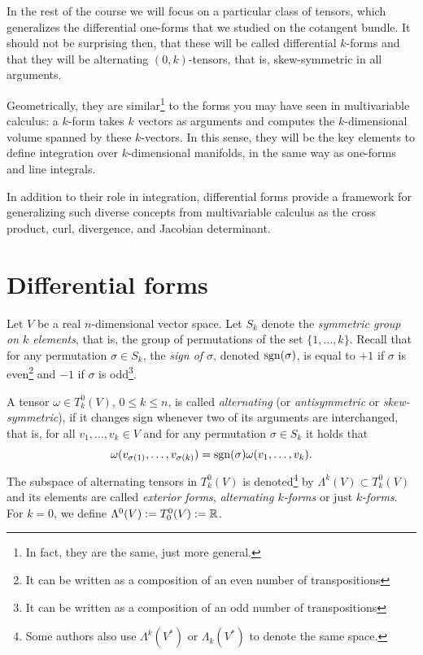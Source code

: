 In the rest of the course we will focus on a particular class of tensors, which generalizes the differential one-forms that we studied on the cotangent bundle.
It should not be surprising then, that these will be called differential $k$-forms and that they will be alternating $(0,k)$-tensors, that is, skew-symmetric in all arguments.

Geometrically, they are similar\footnote{In fact, they are the same, just more general.} to the forms you may have seen in multivariable calculus: a $k$-form takes $k$ vectors as arguments and computes the $k$-dimensional volume spanned by these $k$-vectors.
In this sense, they will be the key elements to define integration over $k$-dimensional manifolds, in the same way as one-forms and line integrals.

In addition to their role in integration, differential forms provide a framework for generalizing such diverse concepts from multivariable calculus as the cross product, curl, divergence, and Jacobian determinant.

\section{Differential forms}

\begin{definition}
	Let $V$ be a real $n$-dimensional vector space.
	Let $S_k$ denote the \emph{symmetric group on $k$ elements}, that is, the group of permutations of the set $\{1,\ldots,k\}$.
	Recall that for any permutation $\sigma\in S_k$, the \emph{sign of $\sigma$}, denoted $\operatorname{sgn}(\sigma)$, is equal to $+1$ if $\sigma$ is even\footnote{It can be written as a composition of an even number of transpositions} and $-1$ if $\sigma$ is odd\footnote{It can be written as a composition of an odd number of transpositions}.

	A tensor $\omega\in T_k^0(V)$, $0\leq k\leq n$, is called \emph{alternating} (or \emph{antisymmetric} or \emph{skew-symmetric}), if it changes sign whenever two of its arguments are interchanged, that is,
	for all $v_1, \ldots, v_k\in V$ and for any permutation $\sigma\in S_k$ it holds that
	\begin{equation}
		\omega(v_{\sigma(1)}, \ldots, v_{\sigma(k)}) = \operatorname{sgn}(\sigma) \omega(v_1, \ldots, v_k).
	\end{equation}
	The subspace of alternating tensors in $T_k^0(V)$ is denoted\footnote{Some authors also use $\Lambda^k(V^*)$ or $\Lambda_k(V^*)$ to denote the same space.} by $\Lambda^k(V) \subset T_k^0(V)$ and its elements are called \emph{exterior forms}, \emph{alternating $k$-forms} or just  \emph{$k$-forms}.
	For $k=0$, we define $\Lambda^0(V) := T_0^0(V) := \mathbb{R}$.
\end{definition}

